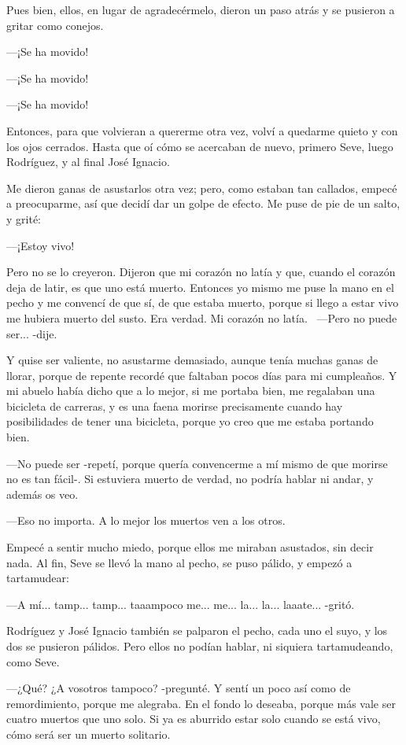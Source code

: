 \documentclass{barcodevapor3pags}
\begin{document}
Pues bien, ellos, en lugar de agradecérmelo, dieron un paso atrás y se
pusieron a gritar como conejos.~

---¡Se ha movido!~

---¡Se ha movido!~

---¡Se ha movido!~

Entonces, para que volvieran a quererme otra vez, volví a quedarme
quieto y con los ojos cerrados. Hasta que oí cómo se acercaban de nuevo,
primero Seve, luego Rodríguez, y al final José Ignacio.



Me dieron ganas de asustarlos otra vez; pero, como estaban tan callados,
empecé a preocuparme, así que decidí dar un golpe de efecto. Me puse de
pie de un salto, y grité:~

---¡Estoy vivo!~

Pero no se lo creyeron. Dijeron que mi corazón no latía y que, cuando el
corazón deja de latir, es que uno está muerto. Entonces yo mismo me puse
la mano en el pecho y me convencí de que sí, de que estaba muerto,
porque si llego a estar vivo me hubiera muerto del susto. Era verdad. Mi
corazón no latía.~
---Pero no puede ser... -dije.~

Y quise ser valiente, no asustarme demasiado, aunque tenía muchas ganas
de llorar, porque de repente recordé que faltaban pocos días para mi
cumpleaños. Y mi abuelo había dicho que a lo mejor, si me portaba bien,
me regalaban una bicicleta de carreras, y es una faena morirse
precisamente cuando hay posibilidades de tener una bicicleta, porque yo
creo que me estaba portando bien.~

---No puede ser -repetí, porque quería convencerme a mí mismo de que
morirse no es tan fácil-. Si estuviera muerto de verdad, no podría
hablar ni andar, y además os veo.~

---Eso no importa. A lo mejor los muertos ven a los otros.~

Empecé a sentir mucho miedo, porque ellos me miraban asustados, sin
decir nada. Al fin, Seve se llevó la mano al pecho, se puso pálido, y
empezó a tartamudear:~

---A mí... tamp... tamp... taaampoco me... me... la... la... laaate...
-gritó.~

Rodríguez y José Ignacio también se palparon el pecho, cada uno el suyo,
y los dos se pusieron pálidos. Pero ellos no podían hablar, ni siquiera
tartamudeando, como Seve.~

---¿Qué? ¿A vosotros tampoco? -pregunté. Y sentí un poco así como de
remordimiento, porque me alegraba. En el fondo lo deseaba, porque más
vale ser cuatro muertos que uno solo. Si ya es aburrido estar solo
cuando se está vivo, cómo será ser un muerto solitario.~
\end{document}
